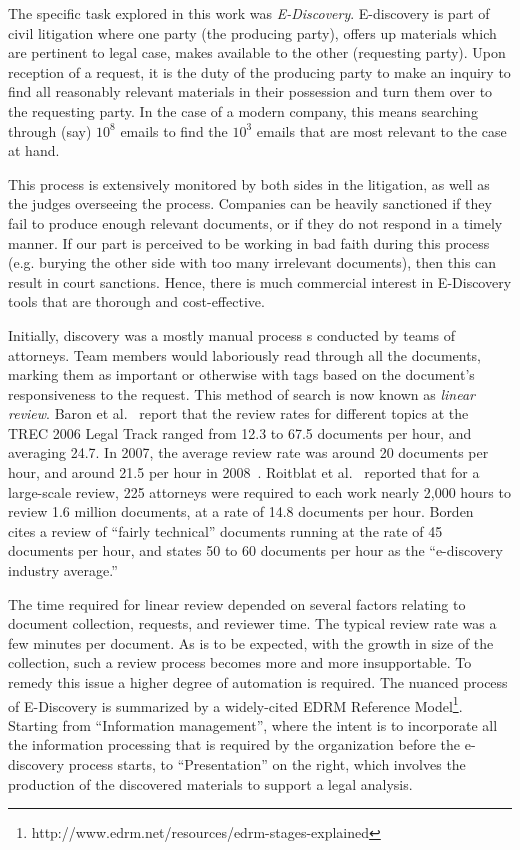 \documentclass{sig-alternate-05-2015}
\theoremstyle{break}
\begin{document}
The specific  task explored in this work was {\em E-Discovery}.
  E-discovery is part of  civil litigation where one party (the producing party), offers up   materials which are pertinent to legal case, makes available to the other (requesting party).
  Upon reception of a request, it is the duty of the producing party to make an inquiry to find all reasonably relevant materials in their possession and turn them over to the requesting party.
  In the case of a modern company, this means searching through (say)
  $10^8$ emails to find the $10^3$ emails that are most relevant to the case at hand.
  
This process is extensively monitored by both sides in the litigation,
as well as the judges overseeing the process. Companies can be heavily sanctioned if
they fail to produce enough relevant documents, or if they do not respond in a timely
manner. If our part is perceived to be working in bad faith during this process
(e.g. burying the other side with too many irrelevant documents), then this
can result in court sanctions. Hence, there is much commercial interest in 
E-Discovery tools that are thorough and cost-effective.

Initially, discovery was a mostly manual process s conducted by teams of attorneys. 
Team members would laboriously read through all the documents, marking them as important or otherwise with tags based on the document's responsiveness to the request. This method of search is now known as \textit{linear review}. 
Baron et al.~\cite{baron2006trec} report that the review rates for different topics at the TREC 2006 Legal Track ranged from 12.3 to 67.5 documents per hour, and averaging 24.7. In 2007, the average review rate was around 20 documents per hour, and around 21.5 per hour in 2008~\cite{oard08}. Roitblat et al.~\cite{roitblat} reported that for a large-scale review, 225 attorneys were required to each work nearly 2,000 hours to review 1.6 million documents, at a rate of 14.8 documents per hour. Borden~\cite{borden} cites a review of ``fairly technical'' documents running at the rate of 45 documents per hour, and states 50 to 60 documents per hour as the ``e-discovery industry average.''

The time required for linear  review depended on several factors relating to document
collection, requests, and reviewer time. The typical review rate was a few minutes per document. As is to be expected, with the growth in size of the collection, such a review process becomes more and more insupportable. To remedy this issue a higher degree of automation is required.
The  nuanced process of E-Discovery is summarized  by a widely-cited   EDRM Reference Model\footnote{http://www.edrm.net/resources/edrm-stages-explained}.  Starting from ``Information management'', where the intent is to incorporate all the information processing that is required by the organization before the e-discovery process starts, to ``Presentation'' on the right, which involves the production of the discovered materials to support a legal analysis. 
\end{document}
